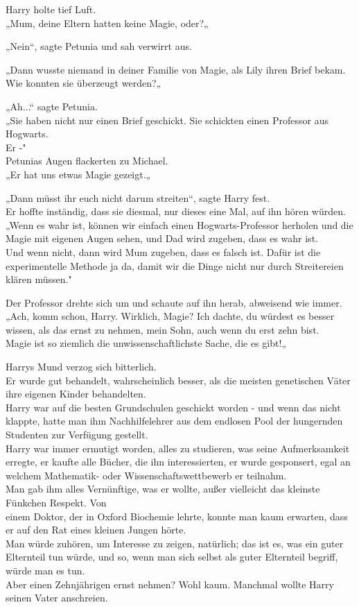 {Harry holte tief Luft.\\ „Mum, deine Eltern hatten keine Magie, oder?„

„Nein“, sagte Petunia und sah verwirrt aus.

„Dann wusste niemand in deiner Familie von Magie, als Lily ihren Brief bekam. Wie konnten sie überzeugt werden?„

„Ah...“ sagte Petunia.\\ „Sie haben nicht nur einen Brief geschickt. Sie schickten einen Professor aus Hogwarts.\\ Er -"\\ Petunias Augen flackerten zu Michael.\\ „Er hat uns etwas Magie gezeigt.„

„Dann müsst ihr euch nicht darum streiten“, sagte Harry fest.\\ Er hoffte inständig, dass sie diesmal, nur dieses eine Mal, auf ihn hören würden.\\ „Wenn es wahr ist, können wir einfach einen Hogwarts-Professor herholen und die Magie mit eigenen Augen sehen, und Dad wird zugeben, dass es wahr ist.\\ Und wenn nicht, dann wird Mum zugeben, dass es falsch ist. Dafür ist die experimentelle Methode ja da, damit wir die Dinge nicht nur durch Streitereien klären müssen."

Der Professor drehte sich um und schaute auf ihn herab, abweisend wie immer.\\ „Ach, komm schon, Harry. Wirklich, Magie? Ich dachte, du würdest es besser wissen, als das ernst zu nehmen, mein Sohn, auch wenn du erst zehn bist.\\ Magie ist so ziemlich die unwissenschaftlichste Sache, die es gibt!„

Harrys Mund verzog sich bitterlich.\\ Er wurde gut behandelt, wahrscheinlich besser, als die meisten genetischen Väter ihre eigenen Kinder behandelten.\\ Harry war auf die besten Grundschulen geschickt worden - und wenn das nicht klappte, hatte man ihm Nachhilfelehrer aus dem endlosen Pool der hungernden Studenten zur Verfügung gestellt.\\ Harry war immer ermutigt worden, alles zu studieren, was seine Aufmerksamkeit erregte, er kaufte alle Bücher, die ihn interessierten, er wurde gesponsert, egal an welchem Mathematik- oder Wissenschaftswettbewerb er teilnahm.\\ Man gab ihm alles Vernünftige, was er wollte, außer vielleicht das kleinste Fünkchen Respekt. Von\\ einem Doktor, der in Oxford Biochemie lehrte, konnte man kaum erwarten, dass er auf den Rat eines kleinen Jungen hörte.\\ Man würde zuhören, um Interesse zu zeigen, natürlich; das ist es, was ein guter Elternteil tun würde, und so, wenn man sich selbst als guter Elternteil begriff, würde man es tun.\\ Aber einen Zehnjährigen ernst nehmen? Wohl kaum. Manchmal wollte Harry seinen Vater anschreien.

}
